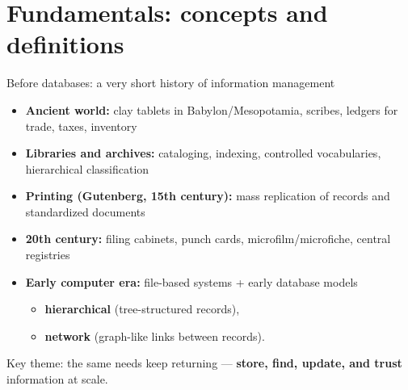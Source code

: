 \documentclass[10pt,aspectratio=169]{beamer}
\begin{document}
\section{Fundamentals: concepts and definitions}

\begin{frame}{Before databases: a very short history of information management}
\begin{itemize}
  \item \textbf{Ancient world:} clay tablets in Babylon/Mesopotamia, scribes, ledgers for trade, taxes, inventory
  \item \textbf{Libraries and archives:} cataloging, indexing, controlled vocabularies, hierarchical classification
  \item \textbf{Printing (Gutenberg, 15th century):} mass replication of records and standardized documents
  \item \textbf{20th century:} filing cabinets, punch cards, microfilm/microfiche, central registries
  \item \textbf{Early computer era:} file-based systems + early database models
    \begin{itemize}
      \item \textbf{hierarchical} (tree-structured records),
      \item \textbf{network} (graph-like links between records).
    \end{itemize}
\end{itemize}
\vspace{0.3em}
\small Key theme: the same needs keep returning --- \textbf{store, find, update, and trust} information at scale.
\end{frame}
\end{document}
